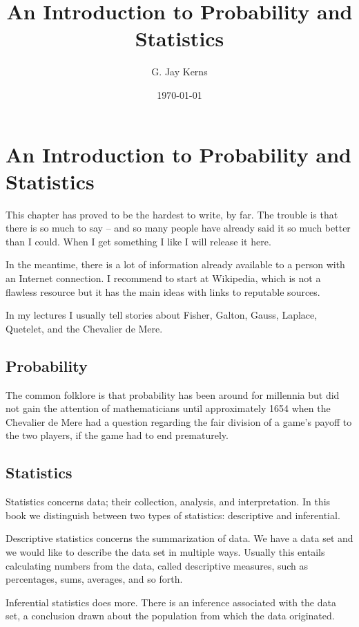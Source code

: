 \documentclass[captions=tableheading]{scrbook}
\title{An Introduction to Probability and Statistics}
\author{G. Jay Kerns}
\date{\today}
\begin{document}
\maketitle


\chapter{An Introduction to Probability and Statistics}
\label{sec-1}



\noindent This chapter has proved to be the hardest to write, by far. The trouble is that there is so much to say -- and so many people have already said it so much better than I could. When I get something I like I will release it here.

In the meantime, there is a lot of information already available to a person with an Internet connection. I recommend to start at Wikipedia, which is not a flawless resource but it has the main ideas with links to reputable sources.

In my lectures I usually tell stories about Fisher, Galton, Gauss, Laplace, Quetelet, and the Chevalier de Mere.
\section{Probability}
\label{sec-1-1}


The common folklore is that probability has been around for millennia but did not gain the attention of mathematicians until approximately 1654 when the Chevalier de Mere had a question regarding the fair division of a game's payoff to the two players, if the game had to end prematurely.
\section{Statistics}
\label{sec-1-2}


Statistics concerns data; their collection, analysis, and interpretation. In this book we distinguish between two types of statistics: descriptive and inferential. 

Descriptive statistics concerns the summarization of data. We have a data set and we would like to describe the data set in multiple ways. Usually this entails calculating numbers from the data, called descriptive measures, such as percentages, sums, averages, and so forth.

Inferential statistics does more. There is an inference associated with the data set, a conclusion drawn about the population from which the data originated.
\end{document}
